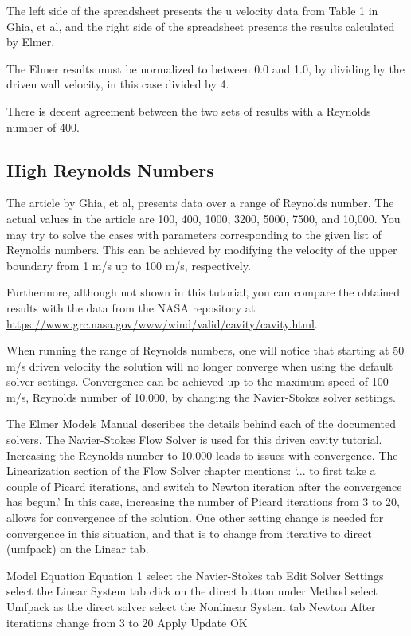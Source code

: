 The left side of the spreadsheet presents the u velocity data from Table 1 in Ghia, et al, and
the right side of the spreadsheet presents the results calculated by Elmer.

The Elmer results must be normalized to between 0.0 and 1.0, by dividing by the
driven wall velocity, in this case divided by 4.

There is decent agreement between the two sets of results with a Reynolds number of 400.\\

\subsection*{High Reynolds Numbers}

The article by Ghia, et al, presents data over a range of Reynolds number.  The actual values
in the article are 100, 400, 1000, 3200, 5000, 7500, and 10,000.  You may try to solve the cases
with parameters corresponding to the given list of Reynolds numbers.  This can be achieved by
modifying the velocity of the upper boundary from 1 m/s up to 100 m/s, respectively.

Furthermore, although not shown in this tutorial, you can compare the obtained results
with the data from the NASA repository at \url{https://www.grc.nasa.gov/www/wind/valid/cavity/cavity.html}.

When running the range of Reynolds numbers, one will notice that starting at 50 m/s driven
velocity the solution will no longer converge when using the default solver settings.  Convergence
can be achieved up to the maximum speed of 100 m/s, Reynolds number of 10,000, by changing the
Navier-Stokes solver settings.

The Elmer Models Manual describes the details behind each of the documented solvers.
The Navier-Stokes Flow Solver is used for this driven cavity tutorial.  Increasing the Reynolds
number to 10,000 leads to issues with convergence.  The Linearization section of the Flow
Solver chapter mentions: `... to first take a couple of Picard iterations, and
switch to Newton iteration after the convergence has begun.'  In this case, increasing the
number of Picard iterations from 3 to 20, allows for convergence of the solution.
One other setting change is needed for convergence in this situation, and
that is to change from iterative to direct (umfpack) on the Linear tab.


\ttbegin
Model
  Equation
    Equation 1
      select the Navier-Stokes tab
      Edit Solver Settings
      select the Linear System tab
        click on the direct button under Method
        select Umfpack as the direct solver
      select the Nonlinear System tab
      Newton After iterations
        change from 3 to 20
      Apply
    Update
  OK
\ttend

